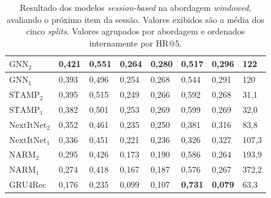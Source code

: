 \begin{table}[htbp]
\begin{tabular}{|l|l|l|l|l|l|l|l|}
    \hline
    \hline
    $\text{GNN}_2$ & \textbf{0,421} & \textbf{0,551} & \textbf{0,264} & \textbf{0,280} & 0,517 & 0,296 & 122 \\
    \hline
    $\text{GNN}_1$ & 0,393 & 0,496 & 0,254 & 0,268 & 0,544 & 0,291 & 120 \\
    \hline
    $\text{STAMP}_2$ & 0,395 & 0,515 & 0,249 & 0,266 & 0,592 & 0,268 & 31,1 \\
    \hline
    $\text{STAMP}_1$ & 0,382 & 0,501 & 0,253 & 0,269 & 0,599 & 0,269 & 32,0 \\
    \hline
    $\text{NextItNet}_2$ & 0,352 & 0,461 & 0,235 & 0,250 & 0,381 & 0,316 & 83,8 \\  
    \hline
    $\text{NextItNet}_1$ & 0,336 & 0,451 & 0,221 & 0,236 & 0,326 & 0,327 & 107,3 \\
    \hline
    $\text{NARM}_2$ & 0,295 & 0,426 & 0,173 & 0,190 & 0,586 & 0,264 & 193,9 \\
    \hline
    $\text{NARM}_1$ & 0,274 & 0,418 & 0,167 & 0,187 & 0,576 & 0,267 & 372,2 \\
    \hline
    GRU4Rec & 0,176 & 0,235 & 0,099 & 0,107 & \textbf{0,731} & \textbf{0,079} & 63,3 \\
    \hline
    \end{tabular}
  \caption{Resultado dos modelos \textit{session-based} na abordagem
  \textit{windowed}, avaliando o próximo item da sessão. Valores exibidos são a
  média dos cinco \textit{splits}. Valores agrupados por abordagem e ordenados internamente por HR@5.}
\label{tab:windowed_next_item_all}
\end{table}


